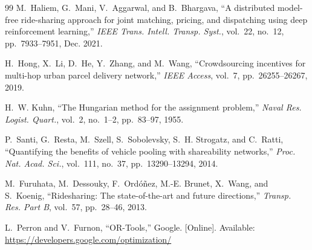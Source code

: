 \documentclass[conference]{IEEEtran}
\begin{document}
\begin{thebibliography}{99}
M.~Haliem, G.~Mani, V.~Aggarwal, and B.~Bhargava, ``A distributed model-free
ride-sharing approach for joint matching, pricing, and dispatching using deep
reinforcement learning,'' \emph{IEEE Trans. Intell. Transp. Syst.}, vol.~22,
no.~12, pp.~7933--7951, Dec. 2021.

H.~Hong, X.~Li, D.~He, Y.~Zhang, and M.~Wang, ``Crowdsourcing incentives for
multi-hop urban parcel delivery network,'' \emph{IEEE Access}, vol.~7,
pp.~26255--26267, 2019.

H.~W. Kuhn, ``The Hungarian method for the assignment problem,'' \emph{Naval
Res. Logist. Quart.}, vol.~2, no.~1--2, pp.~83--97, 1955.

P.~Santi, G.~Resta, M.~Szell, S.~Sobolevsky, S.~H. Strogatz, and C.~Ratti,
``Quantifying the benefits of vehicle pooling with shareability networks,''
\emph{Proc. Nat. Acad. Sci.}, vol.~111, no.~37, pp.~13290--13294, 2014.

M.~Furuhata, M.~Dessouky, F.~Ord\'{o}\~{n}ez, M.-E. Brunet, X.~Wang, and
S.~Koenig, ``Ridesharing: The state-of-the-art and future directions,''
\emph{Transp. Res. Part B}, vol.~57, pp.~28--46, 2013.

L.~Perron and V.~Furnon, ``OR-Tools,'' Google. [Online]. Available:
\url{https://developers.google.com/optimization/}

\end{thebibliography}
\end{document}
